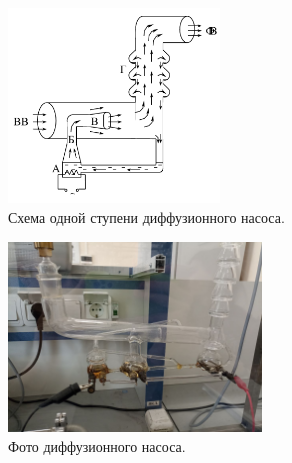 \documentclass[a4paper,12pt]{article}
\begin{document}
    \begin{figure}[h]
        \centering
        \includegraphics[width=0.5\textwidth]{diffuzionni_nasos.png}
        \caption{Схема одной ступени диффузионного насоса.}
        \label{ris:termoparni_monometr}
    \end{figure}
    \begin{figure}[h]
        \centering
        \includegraphics[width=0.6\textwidth]{photo_2025-05-06_01-23-33.jpg}
        \caption{Фото диффузионного насоса.}

    \end{figure}
\end{document}
